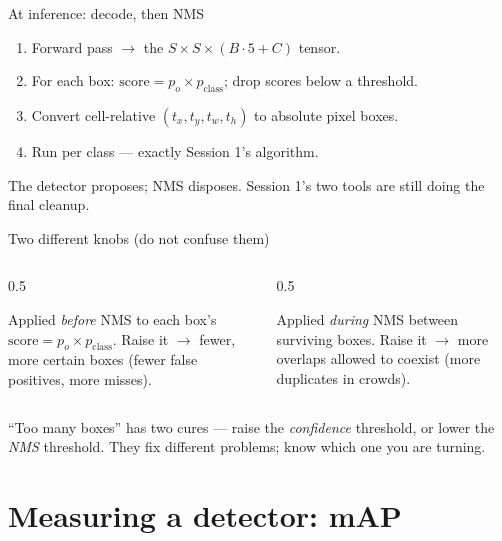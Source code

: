 \documentclass[10pt,aspectratio=169]{beamer}
\begin{document}
\begin{frame}{At inference: decode, then NMS}
  \begin{enumerate}
    \item Forward pass $\rightarrow$ the $S\times S\times(B\cdot5+C)$ tensor.
    \item For each box: $\text{score}=p_o\times p_{\text{class}}$; drop scores below a threshold.
    \item Convert cell-relative $(t_x,t_y,t_w,t_h)$ to absolute pixel boxes.
    \item Run  per class --- exactly Session 1's algorithm.
  \end{enumerate}
  \begin{goodbox}
    The detector proposes; NMS disposes. Session 1's two tools are still doing the final cleanup.
  \end{goodbox}
\end{frame}

\begin{frame}{Two different knobs (do not confuse them)}
  \begin{columns}[T]
    \begin{column}{0.5\textwidth}
      \begin{infobox}
        Applied \emph{before} NMS to each box's $\text{score}=p_o\times p_{\text{class}}$. Raise it $\rightarrow$ fewer, more certain boxes (fewer false positives, more misses).
      \end{infobox}
    \end{column}
    \begin{column}{0.5\textwidth}
      \begin{infobox}
        Applied \emph{during} NMS between surviving boxes. Raise it $\rightarrow$ more overlaps allowed to coexist (more duplicates in crowds).
      \end{infobox}
    \end{column}
  \end{columns}
  \vspace{3pt}
  \begin{badbox}
    ``Too many boxes'' has two cures --- raise the \emph{confidence} threshold, or lower the \emph{NMS} threshold. They fix different problems; know which one you are turning.
  \end{badbox}
\end{frame}

\section{Measuring a detector: mAP}
\end{document}
